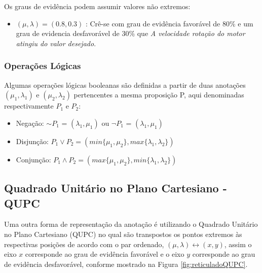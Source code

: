 Os graus de evidência podem assumir valores não extremos:

\begin{itemize}
\item 
$(\mu, \lambda ) = (0.8,0.3)$ : Crê-se com grau de evidência favorável de 80\% e um grau de evidencia desfavorável de 30\%  que \emph{A velocidade rotação do motor atingiu do valor desejado}.
\end{itemize}

\subsubsection{Operações Lógicas}

Algumas operações lógicas booleanas são definidas 
\cite{JISFeAS} \cite{Abe2014}
a partir de duas anotações 
$(\mu _1, \lambda _1)$ e $(\mu _2, \lambda _2)$ 
pertencentes a mesma proposição P, 
aqui denominadas respectivamente $P_1$ e $P_2$:

\begin{itemize}

\item Negação: $\sim$$P _1$ = $(\lambda _1, \mu _1)$ ou 
$\neg$$P _1$ = $(\lambda _1, \mu _1)$

\item Disjunção: $P _1 \vee P _2 = 
(min\{\mu _1, \mu _2\},max\{\lambda _1, \lambda _2\})$ 

\item Conjunção: $P _1 \wedge P _2 = 
(max\{\mu _1, \mu _2\},min\{\lambda _1, \lambda _2\})$ 


\end{itemize}




\subsection{Quadrado Unitário no Plano Cartesiano - QUPC}

Uma outra forma de representação da anotação é utilizando o Quadrado Unitário no Plano Cartesiano (QUPC) no qual são transpostos os pontos extremos às respectivas posições de acordo com o par ordenado,  $(\mu, \lambda ) \leftrightarrow (x,y) $, assim o eixo $x$ corresponde ao grau de evidência favorável e o eixo $y$ corresponde ao grau de evidência desfavorável, conforme mostrado na Figura \ref{fig:reticuladoQUPC}.



